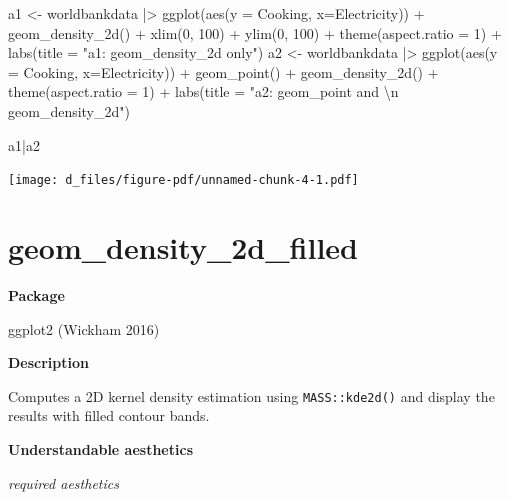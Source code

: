 \documentclass[
  letterpaper,
  DIV=11,
  numbers=noendperiod]{scrreprt}
\newenvironment{Shaded}{\begin{snugshade}}{\end{snugshade}}
\newcommand{\AttributeTok}[1]{\textcolor[rgb]{0.40,0.45,0.13}{#1}}
\newcommand{\DecValTok}[1]{\textcolor[rgb]{0.68,0.00,0.00}{#1}}
\newcommand{\FunctionTok}[1]{\textcolor[rgb]{0.28,0.35,0.67}{#1}}
\newcommand{\NormalTok}[1]{\textcolor[rgb]{0.00,0.23,0.31}{#1}}
\newcommand{\OtherTok}[1]{\textcolor[rgb]{0.00,0.23,0.31}{#1}}
\newcommand{\SpecialCharTok}[1]{\textcolor[rgb]{0.37,0.37,0.37}{#1}}
\newcommand{\StringTok}[1]{\textcolor[rgb]{0.13,0.47,0.30}{#1}}
\begin{document}
\begin{Shaded}
\begin{Highlighting}[]
\NormalTok{a1 }\OtherTok{\textless{}{-}}\NormalTok{ worldbankdata }\SpecialCharTok{|\textgreater{}}
  \FunctionTok{ggplot}\NormalTok{(}\FunctionTok{aes}\NormalTok{(}\AttributeTok{y =}\NormalTok{ Cooking, }\AttributeTok{x=}\NormalTok{Electricity)) }\SpecialCharTok{+}   
  \FunctionTok{geom\_density\_2d}\NormalTok{() }\SpecialCharTok{+}
  \FunctionTok{xlim}\NormalTok{(}\DecValTok{0}\NormalTok{, }\DecValTok{100}\NormalTok{) }\SpecialCharTok{+}
  \FunctionTok{ylim}\NormalTok{(}\DecValTok{0}\NormalTok{, }\DecValTok{100}\NormalTok{) }\SpecialCharTok{+}
  \FunctionTok{theme}\NormalTok{(}\AttributeTok{aspect.ratio =} \DecValTok{1}\NormalTok{) }\SpecialCharTok{+} 
  \FunctionTok{labs}\NormalTok{(}\AttributeTok{title =} \StringTok{"a1: geom\_density\_2d only"}\NormalTok{)}
\NormalTok{a2 }\OtherTok{\textless{}{-}}\NormalTok{ worldbankdata }\SpecialCharTok{|\textgreater{}}
  \FunctionTok{ggplot}\NormalTok{(}\FunctionTok{aes}\NormalTok{(}\AttributeTok{y =}\NormalTok{ Cooking, }\AttributeTok{x=}\NormalTok{Electricity)) }\SpecialCharTok{+}   
  \FunctionTok{geom\_point}\NormalTok{() }\SpecialCharTok{+}
  \FunctionTok{geom\_density\_2d}\NormalTok{() }\SpecialCharTok{+}
  \FunctionTok{theme}\NormalTok{(}\AttributeTok{aspect.ratio =} \DecValTok{1}\NormalTok{) }\SpecialCharTok{+} 
  \FunctionTok{labs}\NormalTok{(}\AttributeTok{title =} \StringTok{"a2: geom\_point and }\SpecialCharTok{\textbackslash{}n}\StringTok{ geom\_density\_2d"}\NormalTok{) }
  
\NormalTok{a1}\SpecialCharTok{|}\NormalTok{a2}
\end{Highlighting}
\end{Shaded}

\texttt{[image: d\_files/figure-pdf/unnamed-chunk-4-1.pdf]}

\section{geom\_density\_2d\_filled}\label{density_2d_filled}

\textbf{Package}

ggplot2 (Wickham 2016)

\textbf{Description}

Computes a 2D kernel density estimation using \texttt{MASS::kde2d()} and
display the results with filled contour bands.

\textbf{Understandable aesthetics}

\emph{required aesthetics}
\end{document}
